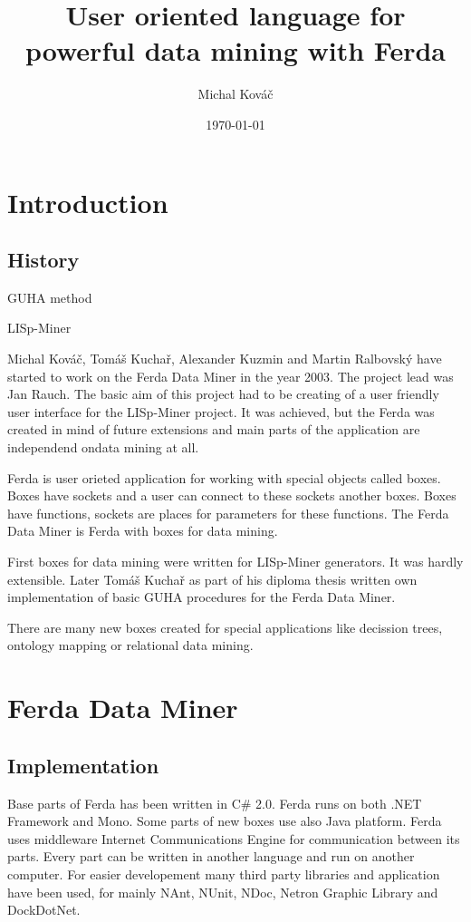\documentclass{article}
\author{Michal Kov\'{a}\v{c}}
\title{User oriented language for powerful data mining with Ferda}
\date{\today}
\begin{document}
\section{Introduction}
\subsection{History}
GUHA method

LISp-Miner

Michal Kov\'{a}\v{c}, Tom\'{a}\v{s} Kucha\v{r}, Alexander Kuzmin and Martin Ralbovsk\'{y} have started to work on the Ferda Data Miner in the year 2003. The project lead was Jan Rauch. The basic aim of this project had to be creating of a user friendly user interface for the LISp-Miner project. It was achieved, but the Ferda was created in mind of future extensions and main parts of the application are independend ondata mining at all.

Ferda is user orieted application for working with special objects called boxes. Boxes have sockets and a user can connect to these sockets another boxes. Boxes have functions, sockets are places for parameters for these functions. The Ferda Data Miner is Ferda with boxes for data mining.

First boxes for data mining were written for LISp-Miner generators. It was hardly extensible. Later Tom\'{a}\v{s} Kucha\v{r} as part of his diploma thesis written own implementation of basic GUHA procedures for the Ferda Data Miner.

There are many new boxes created for special applications like decission trees, ontology mapping or relational data mining.

\section{Ferda Data Miner}
\subsection{Implementation}

Base parts of Ferda has been written in C\# 2.0. Ferda runs on both .NET Framework and Mono. Some parts of new boxes use also Java platform. Ferda uses middleware Internet Communications Engine for communication between its parts. Every part can be written in another language and run on another computer. For easier developement many third party libraries and application have been used, for mainly NAnt, NUnit, NDoc, Netron Graphic Library and DockDotNet. 
\end{document}
